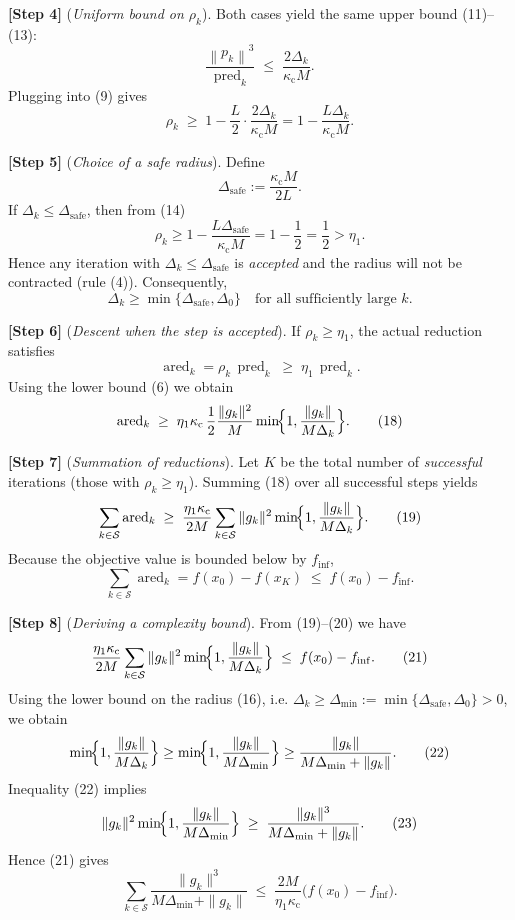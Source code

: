 \documentclass{article}
\newcommand{\norm}[1]{\left\lVert#1\right\rVert}
\begin{document}
\noindent\textbf{[Step 4]} (\emph{Uniform bound on \(\rho_k\)}).  
Both cases yield the same upper bound (11)–(13):
\[
\frac{\norm{p_k}^{3}}{\operatorname{pred}_k}
\;\le\;
\frac{2\Delta_k}{\kappa_{\mathrm{c}}M}.
\]
Plugging into (9) gives
\[
\rho_k \;\ge\;
1 - \frac{L}{2}\cdot\frac{2\Delta_k}{\kappa_{\mathrm{c}}M}
=
1 - \frac{L\Delta_k}{\kappa_{\mathrm{c}}M}.
\tag{14}
\]

\noindent\textbf{[Step 5]} (\emph{Choice of a safe radius}).  
Define
\[
\Delta_{\mathrm{safe}}:=\frac{\kappa_{\mathrm{c}}M}{2L}.
\]
If \(\Delta_k\le \Delta_{\mathrm{safe}}\), then from (14)
\[
\rho_k \ge 1-\frac{L\Delta_{\mathrm{safe}}}{\kappa_{\mathrm{c}}M}
= 1-\frac12 = \frac12 >\eta_1 .
\tag{15}
\]
Hence any iteration with \(\Delta_k\le\Delta_{\mathrm{safe}}\) is \emph{accepted}
and the radius will not be contracted (rule (4)).  Consequently,
\[
\Delta_k \ge \min\{\Delta_{\mathrm{safe}},\Delta_0\}
\quad\text{for all sufficiently large }k.
\tag{16}
\]

\noindent\textbf{[Step 6]} (\emph{Descent when the step is accepted}).  
If \(\rho_k\ge\eta_1\), the actual reduction satisfies
\[
\operatorname{ared}_k
= \rho_k\,\operatorname{pred}_k
\;\ge\;
\eta_1\,\operatorname{pred}_k.
\tag{17}
\]
Using the lower bound (6) we obtain
\[
\operatorname{ared}_k
\;\ge\;
\eta_1\kappa_{\mathrm{c}}\,
\frac12\frac{\|g_k\|^{2}}{M}
\min\!\Bigl\{1,\frac{\|g_k\|}{M\Delta_k}\Bigr\}.
\tag{18}
\]

\noindent\textbf{[Step 7]} (\emph{Summation of reductions}).  
Let \(K\) be the total number of \emph{successful} iterations (those with
\(\rho_k\ge\eta_1\)).  Summing (18) over all successful steps yields
\[
\sum_{k\in\mathcal{S}} \operatorname{ared}_k
\;\ge\;
\frac{\eta_1\kappa_{\mathrm{c}}}{2M}
\sum_{k\in\mathcal{S}} \|g_k\|^{2}
\min\!\Bigl\{1,\frac{\|g_k\|}{M\Delta_k}\Bigr\}.
\tag{19}
\]
Because the objective value is bounded below by \(f_{\inf}\),
\[
\sum_{k\in\mathcal{S}} \operatorname{ared}_k
= f(x_0)-f(x_{K}) \;\le\; f(x_0)-f_{\inf}.
\tag{20}
\]

\noindent\textbf{[Step 8]} (\emph{Deriving a complexity bound}).  
From (19)–(20) we have
\[
\frac{\eta_1\kappa_{\mathrm{c}}}{2M}
\sum_{k\in\mathcal{S}} \|g_k\|^{2}
\min\!\Bigl\{1,\frac{\|g_k\|}{M\Delta_k}\Bigr\}
\;\le\;
f(x_0)-f_{\inf}.
\tag{21}
\]
Using the lower bound on the radius (16), i.e. \(\Delta_k\ge\Delta_{\min}
:=\min\{\Delta_{\mathrm{safe}},\Delta_0\}>0\), we obtain
\[
\min\!\Bigl\{1,\frac{\|g_k\|}{M\Delta_k}\Bigr\}
\ge
\min\!\Bigl\{1,\frac{\|g_k\|}{M\Delta_{\min}}\Bigr\}
\ge
\frac{\|g_k\|}{M\Delta_{\min}+ \|g_k\|}.
\tag{22}
\]
Inequality (22) implies
\[
\|g_k\|^{2}
\min\!\Bigl\{1,\frac{\|g_k\|}{M\Delta_{\min}}\Bigr\}
\;\ge\;
\frac{\|g_k\|^{3}}{M\Delta_{\min}+ \|g_k\|}.
\tag{23}
\]
Hence (21) gives
\[
\sum_{k\in\mathcal{S}} \frac{\|g_k\|^{3}}{M\Delta_{\min}+ \|g_k\|}
\;\le\;
\frac{2M}{\eta_1\kappa_{\mathrm{c}}}\bigl(f(x_0)-f_{\inf}\bigr).
\tag{24}
\]
\end{document}
